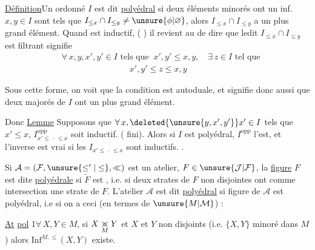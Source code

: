 \uline{Définition}\quad Un  ordonné $I$ est dit \uline{polyédral} si deux éléments minorés ont un inf.   
$x,y\in I$ sont tels que $I_{\leq x}\cap I_{\leq y}\neq\unsure{\phi|\varnothing}$, alors $I_{\leq x}\cap I_{\leq y}$ a un plus grand élément. Quand  est inductif, ( )  il revient au  de dire que ledit  $I_{\leq x}\cap I_{\leq y}$ est filtrant\unsure{,)}  signifie
\[
\begin{aligned}
&\forall\,x,y,x',y'\in I\text{ tels que }\ x',y'\leq x,y,\quad \exists\,z\in I\text{ tel que}\\
&\hspace{8em}x',y'\leq z\leq x,y
\end{aligned}
\]

Sous cette forme, on voit que la condition est autoduale, et signifie donc aussi que deux  majorés de $I$ ont un plus grand élément.

Donc \uline{Lemme} Supposons que $\forall\,x,\deleted{\unsure{y,x',y'}}x'\in I$ tels que $x'\leq x$, $I^{\mathrm{opp}}_{x'\leq\,\cdot\,\leq x}$ soit inductif.  ( fini). Alors si $I$ est polyédral, $I^{\mathrm{opp}}$ l'est, et l'inverse est vrai si les $I_{x'\leq\,\cdot\,\leq x}$ sont inductifs. .

Si  $\mathcal{A}=(\mathcal{F},\unsure{\leq^{\prime}|\leq},\ll)$ est un atelier, $F\in\unsure{\mathcal{J}|\mathcal{F}}$, la \uline{figure} \uline{} $F$ est dite \uline{polyédrale} si $\widetilde{F}$ est , i.e. si deux strates de $F$ non disjointes ont comme intersection une strate de $F$. L'atelier $\mathcal A$ est dit \uline{polyédral} si  figure de $\mathcal A$ est polyédral, i.e si on a ceci (en termes de $\unsure{M|\mathcal{M}}$) :

\uline{At} \uline{pol} 1\quad $\forall\,X,Y\in M$, si $X\underset{M}{\mathrel{>\mkern-12mu<}}Y$ et $X$ et $Y$ non disjoints (i.e. $\{X,Y\}$ minoré dans $M$) alors  $\mathrm{Inf}^{M,\leq}(X,Y)$ existe.


